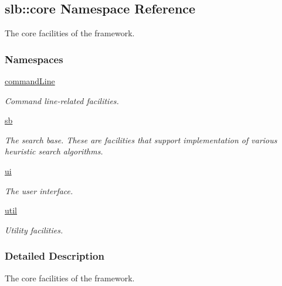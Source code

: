 \hypertarget{namespaceslb_1_1core}{}\subsection{slb\+:\+:core Namespace Reference}
\label{namespaceslb_1_1core}


The core facilities of the framework.  


\subsubsection*{Namespaces}
\begin{DoxyCompactItemize}
\item 
 \hyperlink{namespaceslb_1_1core_1_1commandLine}{command\+Line}
\begin{DoxyCompactList}\small\item\em Command line-\/related facilities. \end{DoxyCompactList}\item 
 \hyperlink{namespaceslb_1_1core_1_1sb}{sb}
\begin{DoxyCompactList}\small\item\em The search base. These are facilities that support implementation of various heuristic search algorithms. \end{DoxyCompactList}\item 
 \hyperlink{namespaceslb_1_1core_1_1ui}{ui}
\begin{DoxyCompactList}\small\item\em The user interface. \end{DoxyCompactList}\item 
 \hyperlink{namespaceslb_1_1core_1_1util}{util}
\begin{DoxyCompactList}\small\item\em Utility facilities. \end{DoxyCompactList}\end{DoxyCompactItemize}


\subsubsection{Detailed Description}
The core facilities of the framework. 